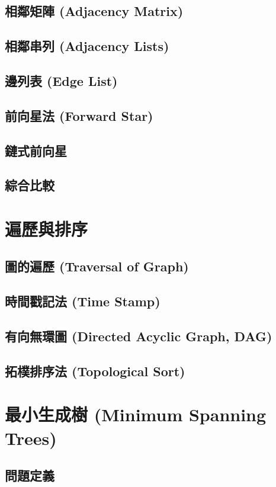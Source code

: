 \documentclass[12pt,a4paper,oneside]{report}
\begin{document}
\begin{CJK}{UTF8}{bkai}
\subsection{相鄰矩陣 (Adjacency Matrix)}
\subsection{相鄰串列 (Adjacency Lists)}
\subsection{邊列表 (Edge List)}
\subsection{前向星法 (Forward Star)}
\subsection{鏈式前向星}
\subsection{綜合比較}

\section{遍歷與排序}
\subsection{圖的遍歷 (Traversal of Graph)}
\subsection{時間戳記法 (Time Stamp)}
\subsection{有向無環圖 (Directed Acyclic Graph, DAG)}
\subsection{拓樸排序法 (Topological Sort)}

\section{最小生成樹 (Minimum Spanning Trees)}
\subsection{問題定義}


\end{CJK}
\end{document}
